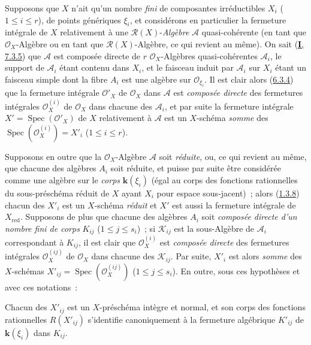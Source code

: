 \begin{env}[6.3.6]
\label{II.6.3.6-fr}
Supposons que $X$ n'ait qu'un nombre \emph{fini} de composantes irréductibles
$X_i$ ($1\leq i\leq r$), de points génériques $\xi_i$, et considérons en
particulier la fermeture intégrale de $X$ relativement à une
$\mathcal{R}(X)$-\emph{Algèbre} $\mathcal{A}$ quasi-cohérente (en tant que
$\mathcal{O}_X$-Algèbre ou en tant que $\mathcal{R}(X)$-Algèbre, ce qui
revient au même). On sait (\hyperref[I.7.3.5-fr]{\textbf{I}, 7.3.5}) que
$\mathcal{A}$ est composée directe de $r$ $\mathcal{O}_X$-Algèbres
quasi-cohérentes $\mathcal{A}_i$, le support de $\mathcal{A}_i$ étant contenu
dans $X_i$, et le faisceau induit par $\mathcal{A}_i$ sur $X_i$ étant un
faisceau simple dont la fibre $A_i$ est une algèbre sur
$\mathcal{O}_{\xi_i}$. Il est clair alors (\hyperref[II.6.3.4-fr]{6.3.4}) que
la fermeture intégrale $\mathcal{O}'_X$ de $\mathcal{O}_X$ dans
$\mathcal{A}$ est \emph{composée directe} des fermetures intégrales
$\mathcal{O}^{(i)}_X$ de $\mathcal{O}_X$ dans chacune des $\mathcal{A}_i$, et
par suite la fermeture intégrale $X'=\operatorname{Spec}(\mathcal{O}'_X)$ de
$X$ relativement à $\mathcal{A}$ est un $X$-schéma \emph{somme} des
$\operatorname{Spec}(\mathcal{O}^{(i)}_X)=X'_i$ ($1\leq i\leq r$).

Supposons en outre que la $\mathcal{O}_X$-Algèbre $\mathcal{A}$ soit
\emph{réduite}, ou, ce qui revient au même, que chacune des algèbres $A_i$
soit réduite, et puisse par suite être considérée comme une algèbre sur le
\emph{corps} $\boldsymbol{k}(\xi_i)$ (égal au corps des fonctions rationnelles du
sous-préschéma réduit de $X$ ayant $X_i$ pour espace sous-jacent)~; alors
(\hyperref[II.1.3.8-fr]{1.3.8}) chacun des $X'_i$ est un $X$-schéma
\emph{réduit} et $X'$ est aussi la fermeture intégrale de $X_{\mathrm{red}}$.
Supposons de plus que chacune des algèbres $A_i$ soit \emph{composée directe
d'un nombre fini de corps} $K_{ij}$ ($1\leq j\leq s_i$)~; si
$\mathcal{K}_{ij}$ est la sous-Algèbre de $\mathcal{A}_i$ correspondant à
$K_{ij}$, il est clair que $\mathcal{O}^{(i)}_X$ est \emph{composée directe}
des fermetures intégrales $\mathcal{O}^{(ij)}_X$ de $\mathcal{O}_X$ dans
chacune des $\mathcal{K}_{ij}$. Par suite, $X'_i$ est alors \emph{somme} des
$X$-schémas $X'_{ij}=\operatorname{Spec}(\mathcal{O}^{(ij)}_X)$
($1\leq j\leq s_i$). En outre, sous ces hypothèses et avec ces notations~:
\end{env}


\begin{proposition}[6.3.7]
\label{II.6.3.7-fr}
Chacun des $X'_{ij}$ est un $X$-préschéma intègre et normal, et son corps des
fonctions rationnelles $R(X'_{ij})$ s'identifie canoniquement à la fermeture
algébrique $K'_{ij}$ de $\boldsymbol{k}(\xi_i)$ dans $K_{ij}$.
\end{proposition}

